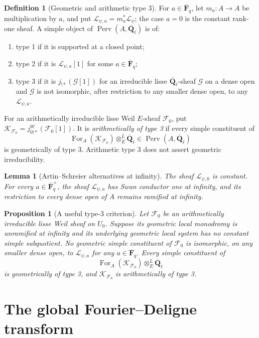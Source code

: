 \documentclass[10pt]{article}
\newtheorem{lemma}[theorem]{Lemma}
\newtheorem{proposition}[theorem]{Proposition}
\theoremstyle{definition}
\newtheorem{definition}[theorem]{Definition}
\newcommand{\Fbar}{\overline{\mathbf F}_q}
\newcommand{\Qlb}{\overline{\mathbf Q}_\ell}
\newcommand{\Perv}{\operatorname{Perv}}
\begin{document}
\begin{definition}[Geometric and arithmetic type 3]
For \(a\in\Fbar\), let \(m_a:A\to A\) be multiplication by \(a\), and put
\(\mathcal L_{\psi,a}=m_a^*\mathcal L_\psi\); the case \(a=0\) is the
constant rank-one sheaf.  A simple object of \(\Perv(A,\Qlb)\) is of:
\begin{enumerate}
\item type 1 if it is supported at a closed point;
\item type 2 if it is \(\mathcal L_{\psi,a}[1]\) for some
\(a\in\Fbar\);
\item type 3 if it is \(j_{!*}(\mathcal G[1])\) for an irreducible lisse
\(\Qlb\)-sheaf \(\mathcal G\) on a dense open and \(\mathcal G\) is not
isomorphic, after restriction to any smaller dense open, to any
\(\mathcal L_{\psi,a}\).
\end{enumerate}
For an arithmetically irreducible lisse Weil \(E\)-sheaf \(\mathcal F_0\),
put \(\mathcal K_{\mathcal F_0}=j_{0!*}^W(\mathcal F_0[1])\).  It is
\emph{arithmetically of type 3} if every simple constituent of
\[
 \operatorname{For}_A(\mathcal K_{\mathcal F_0})
       \otimes_E^L\Qlb\in\Perv(A,\Qlb)
\]
is geometrically of type 3.  Arithmetic type 3 does not assert geometric
irreducibility.
\end{definition}

\begin{lemma}[Artin--Schreier alternatives at infinity]
The sheaf \(\mathcal L_{\psi,0}\) is constant.  For every
\(a\in\Fbar^\times\), the sheaf \(\mathcal L_{\psi,a}\) has Swan conductor
one at infinity, and its restriction to every dense open of \(A\) remains
ramified at infinity.
\end{lemma}

\begin{proposition}[A useful type-3 criterion]
Let \(\mathcal F_0\) be an arithmetically irreducible lisse Weil sheaf on
\(U_0\).  Suppose its geometric local monodromy is unramified at infinity
and its underlying geometric local system has no constant simple
subquotient.  No geometric simple constituent of \(\mathcal F_0\) is
isomorphic, on any smaller dense open, to \(\mathcal L_{\psi,a}\) for any
\(a\in\Fbar\).  Every simple constituent of
\[
 \operatorname{For}_A(\mathcal K_{\mathcal F_0})\otimes_E^L\Qlb
\]
is geometrically of type 3, and \(\mathcal K_{\mathcal F_0}\) is
arithmetically of type 3.
\end{proposition}

\section{The global Fourier--Deligne transform}
\label{sec:global-ft}
\end{document}
